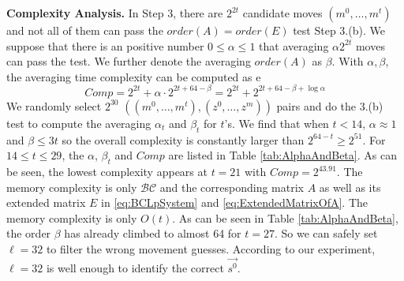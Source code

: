 \noindent\textbf{Complexity Analysis. }
In Step 3, there are $2^{2t}$ candidate moves $(m^0,\ldots, m^{t})$ and not all of them can pass the $order(A)=order(E)$ test Step 3.(b).
We suppose that there is an positive number $0\leq \alpha \leq 1$ that averaging $\alpha  2^{2t}$ moves can pass the test.
We further denote the averaging $order(A)$ as $\beta $.
With $\alpha ,\beta $, the averaging time complexity can be computed as e
\begin{equation}\label{eq:Complexity}
  Comp=2^{2t}+\alpha \cdot 2^{2t+64-\beta }=2^{2t}+2^{2t+64-\beta +\log\alpha }
\end{equation}
We randomly select $2^{30}$ $((m^0,\ldots, m^t), (z^0,\ldots, z^m))$ pairs and do the 3.(b) test to compute the averaging $\alpha_t$ and $\beta_t$ for $t$'s.
We find that when $t<14$, $\alpha \approx 1$ and $\beta\leq 3t$ so the overall complexity is constantly larger than $2^{64-t}\geq 2^{51}$.
For $14\leq t\leq 29$, the $\alpha$, $\beta_t$ and $Comp$ are listed in Table \ref{tab:AlphaAndBeta}.
As can be seen, the lowest complexity appears at $t=21$ with $Comp=2^{43.91}$.
The memory complexity is only $\mathcal{BC}$ and the corresponding matrix $A$ as well as its extended matrix $E$ in \eqref{eq:BCLpSystem} and \eqref{eq:ExtendedMatrixOfA}.
The memory complexity is only $O(t)$.
As can be seen in Table \ref{tab:AlphaAndBeta}, the order $\beta$ has already climbed to almost 64 for $t=27$.
So we can safely set $\ell=32$ to filter the wrong movement guesses.
According to our experiment, $\ell=32$ is well enough to identify the correct $\vec{s^0}$.



